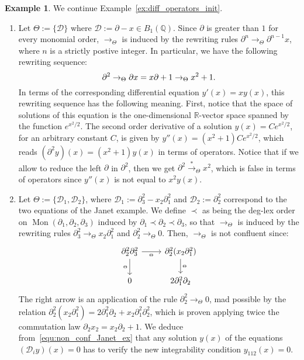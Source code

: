 \documentclass[10pt]{easychair}
\theoremstyle{definition}
\newtheorem{example}[theorem]{Example}
\newcommand\D{\mathcal{D}}
\newcommand\Q{\mathbb{Q}}
\newcommand\R{\mathbb{R}}
\newcommand\Weyl[1]{B_{#1}(\Q)}
\DeclareMathOperator{\Mon}{Mon}
\newcommand\transTheta{\overset{*}{\to}_\Theta}
\newcommand\rewTheta{\to_\Theta}
\begin{document}
\begin{example}\label{ex:diff_operators_rew}
  We continue Example~\ref{ex:diff_operators_init}.
  \begin{enumerate}
  \item\label{it:ODE_rew} Let $\Theta:=\{\D\}$ where
    $\D:=\partial-x\in\Weyl{1}$. Since $\partial$ is greater than $1$ for
    every monomial order, $\rewTheta$ is induced by the rewriting rules
    $\partial^n\rewTheta \partial^{n-1}x$, where $n$ is a strictly
    postive integer. In particular, we have the following rewriting
    sequence:
    \[\partial^2\rewTheta\partial x=x\partial+1\rewTheta x^2+1.
    \smallskip\]
    In terms of the corresponding differential equation $y'(x)=xy(x)$,
    this rewriting sequence has the following meaning. First, notice that
    the space of solutions of this equation is the one-dimensional
    $\R$-vector space spanned by the function $e^{x^2/2}$. The second
    order derivative of a solution $y(x)=Ce^{x^2/2}$, for an arbitrary
    constant $C$, is given by $y''(x)=(x^2+1)Ce^{x^2/2}$, which reads
    $(\partial^2y)(x)=(x^2+1)y(x)$ in terms of operators. Notice that if
    we allow to reduce the left $\partial$ in $\partial^2$, then we get
    $\partial^2\transTheta x^2$, which is false in terms of operators
    since $y''(x)$ is not equal to $x^2y(x)$.
  \item\label{it:Janet_example_rew} Let $\Theta:=\{\D_1,\D_2\}$, where
    $\D_1:=\partial_3^2-x_2\partial_1^2$ and $\D_2:=\partial_2^2$
    correspond to the two equations of the Janet example. We define
    $\prec$ as being the deg-lex order on
    $\Mon(\partial_1,\partial_2,\partial_3)$ induced by
    $\partial_1\prec\partial_2\prec\partial_3$, so that $\rewTheta$ is
    induced by the rewriting rules
    $\partial_3^2\rewTheta x_2\partial_1^2$ and
    $\partial_2^2\rewTheta 0$. Then, $\rewTheta$ is not confluent since:
    \begin{equation}\label{equ:non_conf_Janet_ex}
      \begin{tikzcd}
        \partial_2^2\partial_3^2\ar[d, "_\Theta"']\ar[r, "_\Theta"'] &
        \partial_2^2(x_2\partial_1^2)\ar[d, "_\Theta"]\\
        0 & 2\partial_1^2\partial_2
      \end{tikzcd}
    \end{equation}
    The right arrow is an application of the rule $\partial_2^2 \rewTheta 0$, mad
    possible by the relation
    $\partial_2^2(x_2\partial_1^2)=2 \partial_1^2\partial_2+x_2\partial_1^2\partial_2^2$, which is proven applying twice
    the commutation law $\partial_2x_2=x_2\partial_2+1$.  We deduce
    from~\eqref{equ:non_conf_Janet_ex} that any solution $y(x)$ of the equations
    $(\D_iy)(x)=0$ has to verify the new integrability condition $y_{112}(x)=0$.
  \end{enumerate}
\end{example}
\smallskip
\end{document}
